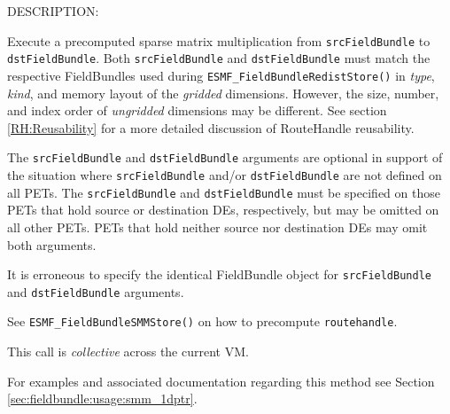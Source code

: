 {\sf DESCRIPTION:\\ }


   Execute a precomputed sparse matrix multiplication from {\tt srcFieldBundle}
   to {\tt dstFieldBundle}.
   Both {\tt srcFieldBundle} and {\tt dstFieldBundle} must match the
   respective FieldBundles used during {\tt ESMF\_FieldBundleRedistStore()}
   in {\em type}, {\em kind}, and memory layout of the {\em gridded}
   dimensions. However, the size, number,
   and index order of {\em ungridded} dimensions may be different. See section
   \ref{RH:Reusability} for a more detailed discussion of RouteHandle
   reusability.
  
   The {\tt srcFieldBundle} and {\tt dstFieldBundle} arguments are optional in support of
   the situation where {\tt srcFieldBundle} and/or {\tt dstFieldBundle} are not defined on
   all PETs. The {\tt srcFieldBundle} and {\tt dstFieldBundle} must be specified on those
   PETs that hold source or destination DEs, respectively, but may be omitted
   on all other PETs. PETs that hold neither source nor destination DEs may
   omit both arguments.
  
   It is erroneous to specify the identical FieldBundle object for {\tt srcFieldBundle} and
   {\tt dstFieldBundle} arguments.
  
   See {\tt ESMF\_FieldBundleSMMStore()} on how to precompute
   {\tt routehandle}.
  
   This call is {\em collective} across the current VM.
  
   For examples and associated documentation regarding this method see Section
   \ref{sec:fieldbundle:usage:smm_1dptr}.
  
